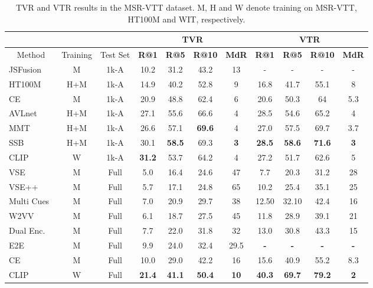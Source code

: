 \documentclass[a4paper,runningheads]{llncs}
\begin{document}
\begin{table}[ht!]
\centering
\begin{tabular}{@{}lcccccccccc@{}}
\cmidrule(l){4-11}
\textbf{} & \multicolumn{1}{l}{\textbf{}} &  & \multicolumn{4}{c}{TVR} & \multicolumn{4}{c}{VTR} \\ \midrule
\multicolumn{1}{c}{Method} & Training & Test Set & \textbf{\textbf{R@1}} & \textbf{\textbf{R@5}} & \textbf{\textbf{R@10}} & \textbf{\textbf{MdR}} & \textbf{R@1} & \textbf{R@5} & \textbf{R@10} & \textbf{MdR} \\ \midrule
JSFusion~\cite{Yu2018JSFusion} & M & 1k-A & 10.2 & 31.2 & 43.2 & 13 & - & - & - & - \\
HT100M~\cite{Miech2019HTM100} & H+M & 1k-A & 14.9 & 40.2 & 52.8 & 9 & 16.8 & 41.7 & 55.1 & 8 \\
CE~\cite{Liu2020CE} & M & 1k-A & 20.9 & 48.8 & 62.4 & 6 & 20.6 & 50.3 & 64 & 5.3 \\
AVLnet~\cite{Rouditchenko2020avlnet} & H+M & 1k-A & 27.1 & 55.6 & 66.6 & 4 & 28.5 & 54.6 & 65.2 & 4 \\
MMT~\cite{Gabeur2020MMT} & H+M & 1k-A & 26.6 & 57.1 & \textbf{69.6} & 4 & 27.0 & 57.5 & 69.7 & 3.7 \\
SSB~\cite{Patrick2021supportset} & H+M & 1k-A & 30.1 & \textbf{58.5} & 69.3 & \textbf{3} & \textbf{28.5} & \textbf{58.6} & \textbf{71.6} & \textbf{3} \\
CLIP & W & 1k-A & \textbf{31.2} & 53.7 & 64.2 & 4 & 27.2 & 51.7 & 62.6 & 5 \\ \midrule
VSE~\cite{Mithun2018MultimodalCuesVSE} & M & Full & 5.0 & 16.4 & 24.6 & 47 & 7.7 & 20.3 & 31.2 & 28 \\
VSE++~\cite{Mithun2018MultimodalCuesVSE} & M & Full & 5.7 & 17.1 & 24.8 & 65 & 10.2 & 25.4 & 35.1 & 25 \\
Multi Cues~\cite{Mithun2018MultimodalCuesVSE} & M & Full & 7.0 & 20.9 & 29.7 & 38 & 12.50 & 32.10 & 42.4 & 16 \\
W2VV~\cite{Dong2018W2VV} & M & Full & 6.1 & 18.7 & 27.5 & 45 & 11.8 & 28.9 & 39.1 & 21 \\
Dual Enc.~\cite{Dong2019dual} & M & Full & 7.7 & 22.0 & 31.8 & 32 & 13.0 & 30.8 & 43.3 & 15 \\
E2E~\cite{Miech2020end} & M & Full & 9.9 & 24.0 & 32.4 & 29.5 & \textbf{-} & \textbf{-} & \textbf{-} & \textbf{-} \\
CE~\cite{Liu2020CE} & M & Full & 10.0 & 29.0 & 42.2 & 16 & 15.6 & 40.9 & 55.2 & 8.3 \\
CLIP & W & Full & \textbf{21.4} & \textbf{41.1} & \textbf{50.4} & \textbf{10} & \textbf{40.3} & \textbf{69.7} & \textbf{79.2} & \textbf{2} \\ \bottomrule
\end{tabular}
\caption{TVR and VTR results in the MSR-VTT dataset. M, H and W denote training on MSR-VTT, HT100M and WIT, respectively.}
\label{table:BigMSRVTT}
\end{table}
\end{document}
